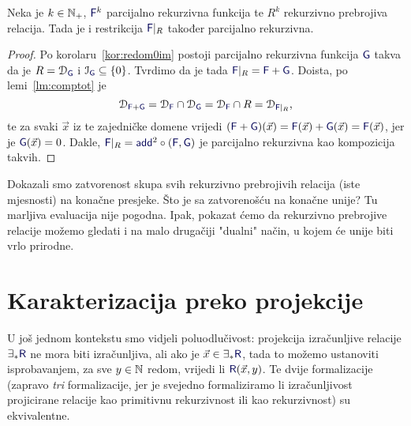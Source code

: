 \begin{korolar}[{name=[teorem o restrikciji]}]\label{kor:restre}
Neka je $k\in{\mathbb N}_+$, $\f F^k$ parcijalno rekurzivna funkcija te $R^k$ rekurzivno prebrojiva relacija. Tada je i restrikcija $\f F|_R$ također parcijalno rekurzivna.
\end{korolar}
\begin{proof}
Po korolaru~\ref{kor:redom0im} postoji parcijalno rekurzivna funkcija $\f G$ takva da je $R=\dom{\f G}$ i $\im{\f G}\subseteq\{0\}$. Tvrdimo da je tada $\f F|_R=\f F+\f G$. Doista, po lemi~\ref{lm:comptot} je
\begin{equation}
\dom{\f F+\f G}=\dom{\f F}\cap\dom{\f G}=\dom{\f F}\cap R=\dom{\f F|_R}\text,
\end{equation}
te za svaki $\vec x$ iz te zajedničke domene vrijedi $(\f F+\f G)(\vec x)=\f F(\vec x)+\f G(\vec x)=\f F(\vec x)$, jer je $\f G(\vec x)=0$. Dakle, $\f F|_R=\f{add}^2\circ(\f F,\f G)$ je parcijalno rekurzivna kao kompozicija takvih.
\end{proof}

Dokazali smo zatvorenost skupa svih rekurzivno prebrojivih relacija (iste mjesnosti) na konačne presjeke. Što je sa zatvorenošću na konačne unije? Tu marljiva evaluacija nije pogodna. Ipak, pokazat ćemo da rekurzivno prebrojive relacije možemo gledati i na malo drugačiji "dualni" način, u kojem će unije biti vrlo prirodne.

\section{Karakterizacija preko projekcije}

U još jednom kontekstu smo vidjeli poluodlučivost: projekcija izračunljive relacije $\exists_*\f R$ ne mora biti izračunljiva, ali ako je $\vec x\in\exists_*\f R$, tada to možemo ustanoviti isprobavanjem, za sve $y\in{\mathbb N}$ redom, vrijedi li $\f R(\vec x,y)$. Te dvije formalizacije (zapravo \emph{tri} formalizacije, jer je svejedno formaliziramo li izračunljivost projicirane relacije kao primitivnu rekurzivnost ili kao rekurzivnost) su ekvivalentne.

